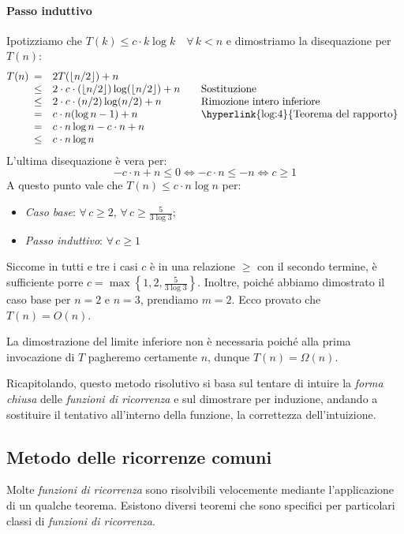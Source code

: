 \begin{eg}
    \paragraph{Passo induttivo} Ipotizziamo che $T(k)\leq c\cdot k\log k\quad\forall\,k<n$
    e dimostriamo la disequazione per $T(n)$:
    \[T(n)\begin{array}[t]{cll}
        = & 2T(\lfloor n/2\rfloor)+n\\
        \leq & 2\cdot c\cdot(\lfloor n/2\rfloor)\log(\lfloor n/2\rfloor)+n & \quad\text{Sostituzione}\\
        \leq & 2\cdot c\cdot(n/2)\log(n/2)+n & \quad\text{Rimozione intero inferiore}\\
        = & c\cdot n(\log n-1)+n & \quad\text{\hyperlink{log:4}{Teorema del rapporto}}\\
        = & c\cdot n\log n-c\cdot n+n\\
        \leq & c\cdot n\log n
    \end{array}\]
    L'ultima disequazione è vera per:
    \[-c\cdot n+n\leq0\Leftrightarrow -c\cdot n\leq -n\Leftrightarrow c\geq1\]
    A questo punto vale che $T(n)\leq c\cdot n\log n$ per:
    \begin{itemize}
        \item \emph{Caso base}: $\forall\,c\geq2,\,\forall\,c\geq\frac{5}{3\log3}$;
        \item \emph{Passo induttivo}: $\forall\,c\geq1$
    \end{itemize}
    Siccome in tutti e tre i casi $c$ è in una relazione $\geq$ con il secondo
    termine, è sufficiente porre $c=\max\left\{1,2,\frac{5}{3\log3}\right\}$.
    Inoltre, poiché abbiamo dimostrato il caso base per $n=2$ e $n=3$, prendiamo
    $m=2$. Ecco provato che $T(n)=O(n)$.

    \bigskip\noindent
    La dimostrazione del limite inferiore non è necessaria poiché alla prima
    invocazione di $T$ pagheremo certamente $n$, dunque $T(n)=\Omega(n)$.
\end{eg}

\bigskip\noindent Ricapitolando, questo metodo risolutivo si basa sul
tentare di intuire la \emph{forma chiusa} delle \emph{funzioni di ricorrenza} e
sul dimostrare per induzione, andando a sostituire il tentativo
all'interno della funzione, la correttezza dell'intuizione.

\subsection{Metodo delle ricorrenze comuni}
Molte \emph{funzioni di ricorrenza} sono risolvibili velocemente mediante
l'applicazione di un qualche teorema. Esistono diversi teoremi che sono
specifici per particolari classi di \emph{funzioni di ricorrenza}.

